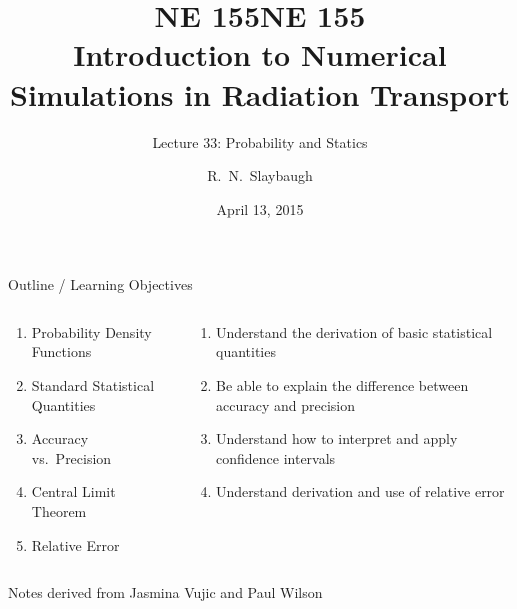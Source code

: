 \documentclass[xcolor=x11names,compress]{beamer}
\title{NE 155}
\author{R.\ N.\ Slaybaugh}
\date{April 13, 2015}
\renewcommand{\(}{\begin{columns}}
\renewcommand{\)}{\end{columns}}
\newcommand{\<}[1]{\begin{column}{#1}}
\renewcommand{\>}{\end{column}}
\begin{document}
\begin{frame}
\title{NE 155\\Introduction to Numerical Simulations in Radiation Transport}
\subtitle{Lecture 33: Probability and Statics}
\titlepage
\end{frame}

\begin{frame}{Outline / Learning Objectives}

\begin{columns}
  \begin{column}{0.5\textwidth}
    \begin{enumerate}
    \item Probability Density Functions
    \item Standard Statistical Quantities
    \item Accuracy vs.\ Precision
    \item Central Limit Theorem
    \item Relative Error
    \end{enumerate}
  \end{column}
  \begin{column}{0.5\textwidth}
    \begin{enumerate}
    \item Understand the derivation of basic statistical quantities
    \item Be able to explain the difference between accuracy and precision 
    \item Understand how to interpret and apply confidence intervals
    \item Understand derivation and use of relative error
    \end{enumerate}
  \end{column}
\end{columns}

\vspace*{1em}
Notes derived from Jasmina Vujic and Paul Wilson
\end{frame}

\end{document}

